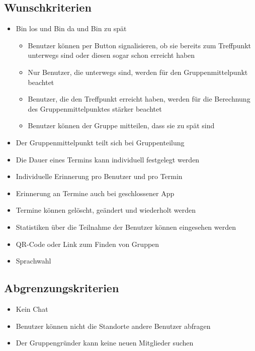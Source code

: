 \documentclass{scrartcl}
\begin{document}
	\subsection{Wunschkriterien}
	\begin{itemize}
		\item \glqq{}Bin los\grqq{} und \glqq{}Bin da\grqq{} und \glqq{}Bin zu spät\grqq{}
		\begin{itemize}
			\item Benutzer können per Button signalisieren, ob sie bereits zum Treffpunkt unterwegs sind oder diesen sogar schon erreicht haben
			\item Nur Benutzer, die unterwegs sind, werden für den Gruppenmittelpunkt beachtet
			\item Benutzer, die den Treffpunkt erreicht haben, werden für die Berechnung des Gruppenmittelpunktes stärker beachtet
			\item Benutzer können der Gruppe mitteilen, dass sie zu spät sind
		\end{itemize}
		\item Der Gruppenmittelpunkt teilt sich bei Gruppenteilung
		\item Die Dauer eines Termins kann individuell festgelegt werden
		\item Individuelle Erinnerung pro Benutzer und pro Termin
		\item Erinnerung an Termine auch bei geschlossener App
		\item Termine können gelöscht, geändert und wiederholt werden
		\item Statistiken über die Teilnahme der Benutzer können eingesehen werden
		\item QR-Code oder Link zum Finden von Gruppen
		\item Sprachwahl
	\end{itemize}
	\subsection{Abgrenzungskriterien}
	\begin{itemize}
		\item Kein Chat
		\item Benutzer können nicht die Standorte andere Benutzer abfragen
		\item Der Gruppengründer kann keine neuen Mitglieder suchen
	\end{itemize}
	
	\newpage
	
	
	
\end{document}
